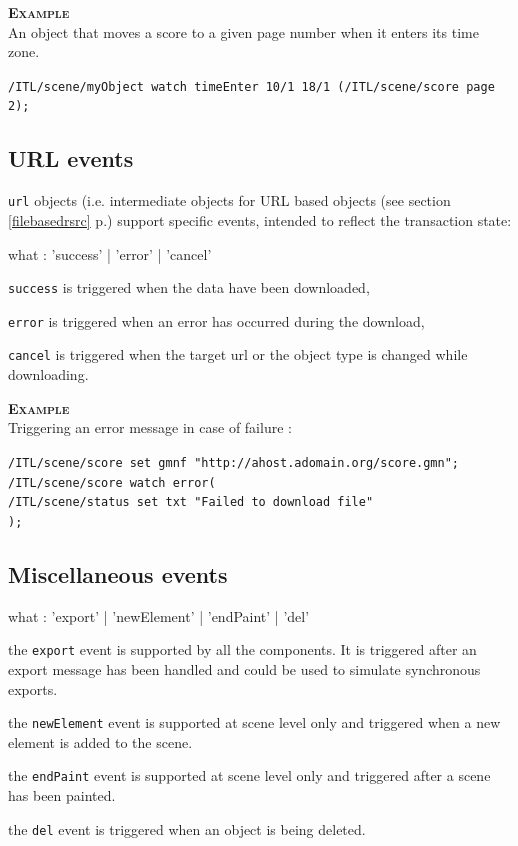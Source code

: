 \documentclass[a4paper,twoside]{report}
\newcommand{\subsublevel}[1]	{\subsection{#1}}
\newcommand{\fullref}[1]	{\ref{#1} p.\pageref{#1}}
\newcommand{\OSC}[1]		{\texttt{#1}}
\newcommand{\example}		{\textbf{\hspace{-1.5cm}\textbf{\textsc{Example }}}}
\let\olditemize\itemize
\let\oldenditemize\enditemize
\renewenvironment{itemize} 	{\olditemize \setlength{\itemsep}{1mm}}{\oldenditemize}
\newcommand{\sample}	[1]			{\vspace{-2mm}\begin{center}\colorbox{mygrey}{
								\begin{minipage}[t]{0.9\columnwidth} 
								{\small \texttt{#1}}
								\end{minipage}}\end{center}}
\newcommand{\samplev}[1]			{\begin{center}\colorbox{mygrey}{
								\begin{minipage}[t]{\columnwidth} 
								{\small \texttt{#1}}
								\end{minipage}}\end{center}}
\begin{document}
\example \\
An object that moves a score to a given page number when it enters its time zone.
\samplev{/ITL/scene/myObject watch timeEnter 10/1 18/1 (/ITL/scene/score page 2);}

\subsublevel{URL events}
\label{urlevents}

\OSC{url} objects (i.e. intermediate objects for URL based objects (see section \fullref{filebasedrsrc}) support specific events, intended to reflect the transaction state:

\begin{rail}
what : 	'success'  
		| 'error'
		| 'cancel'
\end{rail}

\begin{itemize}
\item \OSC{success} is triggered when the data have been downloaded,
\item \OSC{error} is triggered when an error has occurred during the download,
\item \OSC{cancel} is triggered when the target url or the object type is changed while downloading.
\end{itemize}

\example \\
Triggering an error message in case of failure :
\sample{/ITL/scene/score set gmnf "http://ahost.adomain.org/score.gmn";\\
/ITL/scene/score watch error(\\
\hspace*{5mm}/ITL/scene/status set txt "Failed to download file"\\
);
}


\subsublevel{Miscellaneous events}
\label{miscevents}

\begin{rail}
what : 	  'export'
		| 'newElement'
		| 'endPaint'
		| 'del'
\end{rail}

\begin{itemize}
\item the \OSC{export} event is supported by all the components. It is triggered after an export message has been handled and could be used to simulate synchronous exports.
\item the \OSC{newElement} event is supported at scene level only and triggered when a new element is added to the scene.
\item the \OSC{endPaint} event is supported at scene level only and triggered after a scene has been painted.
\item the \OSC{del} event is triggered when an object is being deleted.
\end{itemize}
\end{document}
